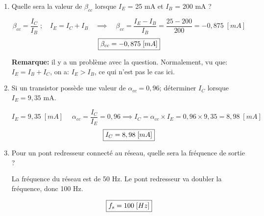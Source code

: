 \documentclass[a4paper]{article}
\begin{document}
\begin{enumerate}
\item Quelle sera la valeur de $ \beta_{cc} $ lorsque $ I_E $ = 25 mA et $ I_B $ = 200 mA ?
\begin{example}
    \[ \beta_{cc} = \frac{I_C}{I_B} \; ; \quad I_E = I_C + I_B \quad \implies \quad \beta_{cc} = \frac{I_E - I_B}{I_B} = \frac{25 - 200}{200} = -0,875 \; [mA] \]
    \[ \fbox{$\displaystyle \beta_{cc} = -0,875 \; [mA] $} \]

    \textbf{Remarque:} il y a un problème avec la question. Normalement, vu que: $ I_E = I_B + I_C $, on a: $ I_E > I_B $, ce qui n'est pas le cas ici.
\end{example}





\item Si un transistor possède une valeur de $ \alpha_{cc} = 0,96 $; déterminer $ I_C $ lorsque $ I_E = 9,35 $ mA.
\begin{example}
    \[ I_E = 9,35 \; [mA] \; \quad \alpha_{cc} = \frac{I_C}{I_E} = 0,96 \implies I_C = \alpha_{cc} \times I_E = 0,96 \times 9,35 = 8,98 \; [mA] \]
    \[ \fbox{$\displaystyle I_C = 8,98 \; [mA] $} \]
\end{example}





\item \label{QPontRedresseur1} Pour un pont redresseur connecté au réseau, quelle sera la fréquence de sortie ?
\begin{example}
    La fréquence du réseau est de 50 Hz. Le pont redresseur va doubler la fréquence, donc 100 Hz.
    \begin{center}
    \end{center}
    \[ \fbox{$f_s = 100 \; [Hz]$} \]
\end{example}






\end{enumerate}
\end{document}
